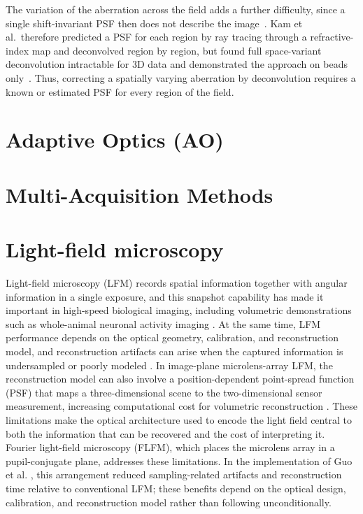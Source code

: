 The variation of the aberration across the field adds a further difficulty, since a single shift-invariant PSF then does not describe the image~\cite{sarder2006deconvolutionMethods,kam2001computationalAdaptiveOptics}. Kam et al.\ therefore predicted a PSF for each region by ray tracing through a refractive-index map and deconvolved region by region, but found full space-variant deconvolution intractable for 3D data and demonstrated the approach on beads only~\cite{kam2001computationalAdaptiveOptics}. Thus, correcting a spatially varying aberration by deconvolution requires a known or estimated PSF for every region of the field.

\section{Adaptive Optics (AO)}
\label{sec:lit-adaptive-optics}

\section{Multi-Acquisition Methods}
\label{sec:lit-multi-acquisition}

\section{Light-field microscopy}
\label{sec:lit-light-field-microscopy}
Light-field microscopy (LFM) records spatial information together with angular information in a single exposure, and this snapshot capability has made it important in high-speed biological imaging, including volumetric demonstrations such as whole-animal neuronal activity imaging \cite{prevedel2014wholeAnimalLfm}. At the same time, LFM performance depends on the optical geometry, calibration, and reconstruction model, and reconstruction artifacts can arise when the captured information is undersampled or poorly modeled \cite{levoy2009recordingControlling4d,broxton2013waveOpticsLfm,stefanoiu2019artifactFreeDeconvolution}. In image-plane microlens-array LFM, the reconstruction model can also involve a position-dependent point-spread function (PSF) that maps a three-dimensional scene to the two-dimensional sensor measurement, increasing computational cost for volumetric reconstruction \cite{broxton2013waveOpticsLfm,guo2019fourierLightField}. These limitations make the optical architecture used to encode the light field central to both the information that can be recovered and the cost of interpreting it. Fourier light-field microscopy (FLFM), which places the microlens array in a pupil-conjugate plane, addresses these limitations. In the implementation of Guo et al. \cite{guo2019fourierLightField}, this arrangement reduced sampling-related artifacts and reconstruction time relative to conventional LFM; these benefits depend on the optical design, calibration, and reconstruction model rather than following unconditionally.
